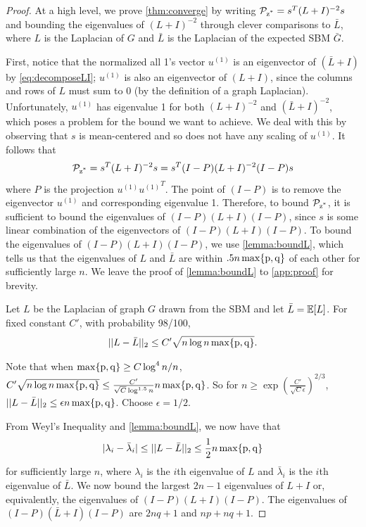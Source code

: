 \begin{proof}
At a high level, we prove \cref{thm:converge}
by writing $\operatorname*{\mathcal{P}_{z^*}} = s^T(L+I)^{-2}s$ 
and bounding the eigenvalues of $(L+I)^{-2}$
through clever comparisons to $\bar{L}$,
where $L$ is the Laplacian of $G$
and $\bar{L}$ is the Laplacian of the expected SBM $\bar{G}$.

First, notice that the normalized all 1's vector
$u^{(1)}$ is an eigenvector
of $(\bar{L}+I)$ by \cref{eq:decomposeLI}; $u^{(1)}$ is also an eigenvector
of $(L+I)$, since the columns and rows of $L$
must sum to 0 (by the definition of a graph Laplacian).
Unfortunately, $u^{(1)}$ has eigenvalue 1
for both $(L+I)^{-2}$ and $(\bar{L}+I)^{-2}$,
which poses a problem for the
bound we want to achieve.
We deal with this by
observing that $s$ is mean-centered and so
does not have any scaling of $u^{(1)}$.
It follows that
\begin{align}
    \operatorname*{\mathcal{P}_{z^*}} = s^T (L+I)^{-2} s = s^T (I-P)
    (L+I)^{-2}(I-P) s \nonumber
\end{align}
where $P$ is the projection $u^{(1)} {u^{(1)}}^T$.
The point of $(I-P)$ is to remove the eigenvector $u^{(1)}$
and corresponding eigenvalue 1.
Therefore, to bound $\operatorname*{\mathcal{P}_{z^*}}$, it is sufficient to
bound the eigenvalues of $(I-P)(L+I)(I-P)$, since
$s$ is some linear combination of the eigenvectors of
$(I-P)(L+I)(I-P)$.
To bound the eigenvalues of $(I-P)(L+I)(I-P)$,
we use \cref{lemma:boundL}, which tells us that the
eigenvalues of $L$ and $\bar{L}$ are within
$.5n\operatorname*{\max \{p, q\}}$ of each other for sufficiently large $n$.
We leave the proof of \cref{lemma:boundL} to
\cref{app:proof} for brevity.

\begin{lemma}\label{lemma:boundL}
    Let $L$ be the Laplacian of graph $G$ drawn from
    the SBM and let $\bar{L} =\operatorname*{\mathbb{E}}[L]$. For fixed constant
    $C'$, with probability 98/100,
    \begin{align}
        ||L - \bar{L}||_2 \leq C' \sqrt{ n \log n \operatorname*{\max \{p, q\}}} \nonumber.
    \end{align}
\end{lemma}

Note that when $\operatorname*{\max \{p, q\}} \geq C \log^4 n /n$,
$C' \sqrt{ n \log n \operatorname*{\max \{p, q\}}} \leq \frac{C'}{\sqrt{C} \log^{1.5} n}
n \operatorname*{\max \{p, q\}}$.
So for $n \geq \exp(\frac{C'}{\sqrt{C}\epsilon})^{2/3}$,
$||L-\bar{L}||_2 \leq \epsilon n \operatorname*{\max \{p, q\}}$.
Choose $\epsilon = 1/2$.

From Weyl's Inequality and \cref{lemma:boundL}, we now have that
\begin{align}\label{eq:weyls}
    |\lambda_i - \bar{\lambda}_i| \leq ||L - \bar{L}||_2 \leq 
    \frac{1}{2} n \operatorname*{\max \{p, q\}}
\end{align}
for sufficiently large $n$,
where $\lambda_i$ is the $i$th eigenvalue of $L$ and 
$\bar{\lambda}_i$ is the $i$th eigenvalue of $\bar{L}$.
We now bound the largest $2n-1$ eigenvalues of $L+I$
or, equivalently, the eigenvalues of $(I-P)(L+I)(I-P)$.
The eigenvalues of $(I-P)(\bar{L}+I)(I-P)$ are $2nq+1$
and $np+nq+1$.


\end{proof}
